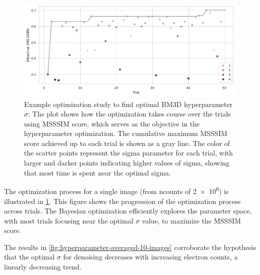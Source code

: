 \begin{figure}
    \centering
    \includegraphics[width=\textwidth]{images/optimization_against_trial.pdf}
    \caption{Example optimization study to find optimal BM3D hyperparameter $\sigma$: The plot shows how the optimization takes course over the trials using \gls{MSSSIM} score, which serves as the objective in the hyperparameter optimization. The cumulative maximum \gls{MSSSIM} score achieved up to each trial is shown as a gray line. The color of the scatter points represent the sigma parameter for each trial, with larger and darker points indicating higher values of sigma, showing that most time is spent near the optimal sigma.}
    \label{fig:optimization-against-trial}
\end{figure}

The optimization process for a single image (from \gls{ncounts} of \num{2e6}) is illustrated in \cref{fig:optimization-against-trial}. This figure shows the progression of the optimization process across trials. The Bayesian optimization efficiently explores the parameter space, with most trials focusing near the optimal $\sigma$ value, to maximize the \gls{MSSSIM} score.

The results in \cref{fig:hyperparameter-averaged-10-images} corroborate the hypothesis that the optimal $\sigma$ for denoising decreases with increasing electron counts, a linearly decreasing trend.




